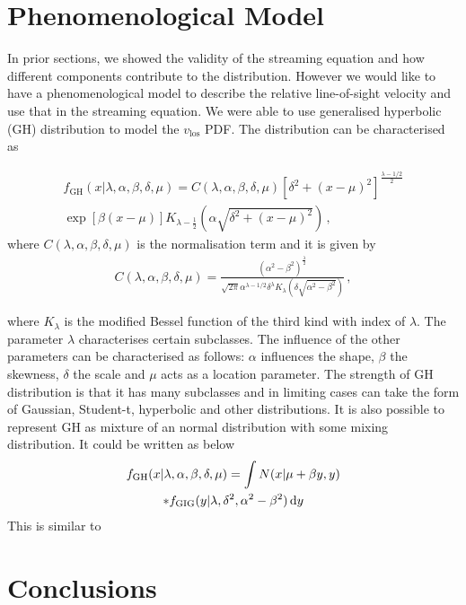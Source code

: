 \documentclass[a4paper,fleqn,usenatbib]{mnras}
\begin{document}
	\section{Phenomenological Model}

	In prior sections, we showed the validity of the streaming equation and how different components contribute to the distribution. However we would like to have a phenomenological model to describe the relative line-of-sight velocity and use that in the streaming equation. We were able to use generalised hyperbolic (GH) distribution to model the $v_{\mathrm{los}}$ PDF. The distribution can be characterised as
	
	\begin{multline}
		f_{\mathrm{GH}}(x|\lambda, \alpha,\beta,\delta,\mu) = C\left(\lambda, \alpha,\beta,\delta,\mu\right) \left[\delta^2+\left(x-\mu\right)^2\right]^{\frac{\lambda-1/2}{2}}  \\
		\exp\left[\beta\left(x-\mu\right)\right] K_{\lambda-\frac{1}{2}}\left(\alpha\sqrt{\delta^2+(x-\mu)^2}\right) \, ,
	\end{multline}
	\noindent where $C\left(\lambda, \alpha,\beta,\delta,\mu\right)$ is the normalisation term and it is given by
	\begin{eqnarray}
		C\left(\lambda, \alpha,\beta,\delta,\mu\right) = \frac{\left(\alpha^2-\beta^2\right)^{\frac{\lambda}{2}}}{\sqrt{2\pi}\alpha^{\lambda - 1/2}\delta^\lambda K_{\lambda}\left(\delta\sqrt{\alpha^2-\beta^2}\right)}  \, ,
	\end{eqnarray}
	
	\noindent where $K_{\lambda}$ is the modified Bessel function of the third kind with index of $\lambda$. The parameter $\lambda$ characterises certain subclasses. The influence of the other parameters can be characterised as follows: $\alpha$ influences the shape, $\beta$ the skewness, $\delta$ the scale and $\mu$ acts as a location parameter. The strength of GH distribution is that it has many subclasses and in limiting cases can take the form of Gaussian, Student-t, hyperbolic and other distributions. It is also possible to represent GH as mixture of an normal distribution with some mixing distribution. It could be written as below
	\begin{multline}
		f_{\mathrm{GH}}(x|\lambda, \alpha,\beta,\delta,\mu) = \int  N(x | \mu + \beta y, y) \\
		* f_{\mathrm{GIG}}(y | \lambda, \delta^2, \alpha^2-\beta^2) \dif y
	\end{multline}
	This is similar to
	\section{Conclusions}
	
\end{document}
